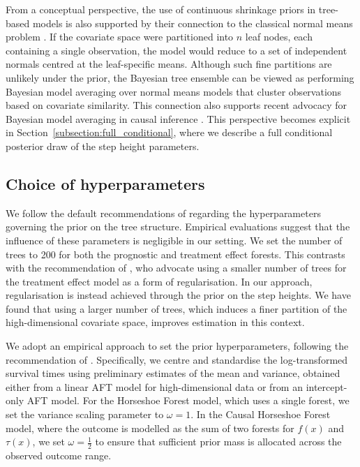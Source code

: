 From a conceptual perspective, the use of continuous shrinkage priors in tree-based models is also supported by their connection to the classical normal means problem \citep{james1961estimation}. 
If the covariate space were partitioned into $n$ leaf nodes, each containing a single observation, the model would reduce to a set of independent normals centred at the leaf-specific means. 
Although such fine partitions are unlikely under the prior, the Bayesian tree ensemble can be viewed as performing Bayesian model averaging over normal means models that cluster observations based on covariate similarity.
This connection also supports recent advocacy for Bayesian model averaging in causal inference \citep{Wang2012, Zigler2016, Horii2021BMA, Antonelli2020Averaging}.
This perspective becomes explicit in Section~\ref{subsection:full_conditional}, where we describe a full conditional posterior draw of the step height parameters. 



\subsection{Choice of hyperparameters}\label{default_hyperparameters}
We follow the default recommendations of \citet{BARToriginal} regarding the hyperparameters governing the prior on the tree structure. 
Empirical evaluations suggest that the influence of these parameters is negligible in our setting. 
We set the number of trees to 200 for both the prognostic and treatment effect forests. 
This contrasts with the recommendation of \citet{hahn2020bayesian}, who advocate using a smaller number of trees for the treatment effect model as a form of regularisation. 
In our approach, regularisation is instead achieved through the prior on the step heights. 
We have found that using a larger number of trees, which induces a finer partition of the high-dimensional covariate space, improves estimation in this context.

We adopt an empirical approach to set the prior hyperparameters, following the recommendation of \citet{BARToriginal}. 
Specifically, we centre and standardise the log-transformed survival times using preliminary estimates of the mean and variance, obtained either from a linear AFT model for high-dimensional data \citep{Kumari2025afthd} or from an intercept-only AFT model. 
For the Horseshoe Forest model, which uses a single forest, we set the variance scaling parameter to $\omega = 1$. 
In the Causal Horseshoe Forest model, where the outcome is modelled as the sum of two forests for $f(x)$ and $\tau(x)$, we set $\omega = \frac{1}{2}$ to ensure that sufficient prior mass is allocated across the observed outcome range. 


